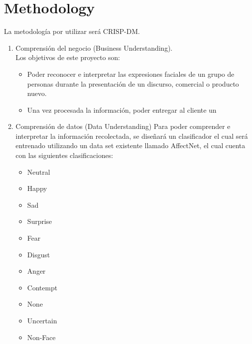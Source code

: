 
\section{Methodology}

La metodología por utilizar será CRISP-DM.\@
\begin{enumerate}
      \item Comprensión del negocio (Business Understanding). \\Los objetivos de este
            proyecto son:
            \begin{itemize}
                  \item Poder reconocer e interpretar las expresiones faciales de un grupo de personas
                        durante la presentación de un discurso, comercial o producto nuevo.
                  \item Una vez procesada la información, poder entregar al cliente un
            \end{itemize}

      \item Comprensión de datos (Data Understanding) Para poder comprender e interpretar
            la información recolectada, se diseñará un clasificador el cual será entrenado
            utilizando un data set existente llamado AffectNet\cite[]{8013713}, el cual
            cuenta con las siguientes clasificaciones:
            \begin{itemize}
                  \item Neutral
                  \item Happy
                  \item Sad
                  \item Surprise
                  \item Fear
                  \item Disgust
                  \item Anger
                  \item Contempt
                  \item None
                  \item Uncertain
                  \item Non-Face
            \end{itemize}


\end{enumerate}

